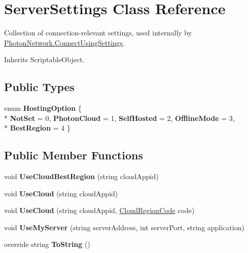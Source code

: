 \hypertarget{class_server_settings}{}\section{Server\+Settings Class Reference}
\label{class_server_settings}


Collection of connection-\/relevant settings, used internally by \hyperlink{class_photon_network_a0fdb79bcce45801ec81fbe56ffb939ec}{Photon\+Network.\+Connect\+Using\+Settings}.  




Inherits Scriptable\+Object.

\subsection*{Public Types}
\begin{DoxyCompactItemize}
\item 
enum {\bfseries Hosting\+Option} \{ \\*
{\bfseries Not\+Set} = 0, 
{\bfseries Photon\+Cloud} = 1, 
{\bfseries Self\+Hosted} = 2, 
{\bfseries Offline\+Mode} = 3, 
\\*
{\bfseries Best\+Region} = 4
 \}\hypertarget{class_server_settings_ac70398ae8a3414ab1429069965cfcd32}{}\label{class_server_settings_ac70398ae8a3414ab1429069965cfcd32}

\end{DoxyCompactItemize}
\subsection*{Public Member Functions}
\begin{DoxyCompactItemize}
\item 
void {\bfseries Use\+Cloud\+Best\+Region} (string cloud\+Appid)\hypertarget{class_server_settings_aeb0c2bda5dd14905c6d82c5166971117}{}\label{class_server_settings_aeb0c2bda5dd14905c6d82c5166971117}

\item 
void {\bfseries Use\+Cloud} (string cloud\+Appid)\hypertarget{class_server_settings_a3fd2ceafc9192779c59a646884ba9810}{}\label{class_server_settings_a3fd2ceafc9192779c59a646884ba9810}

\item 
void {\bfseries Use\+Cloud} (string cloud\+Appid, \hyperlink{_enums_8cs_af823e3be9567fa753720895120c9819b}{Cloud\+Region\+Code} code)\hypertarget{class_server_settings_ae9dc8779d32a07848cb6e9063ae215d6}{}\label{class_server_settings_ae9dc8779d32a07848cb6e9063ae215d6}

\item 
void {\bfseries Use\+My\+Server} (string server\+Address, int server\+Port, string application)\hypertarget{class_server_settings_ae0eef79dfdcf1d7d7577094dadc4ca4b}{}\label{class_server_settings_ae0eef79dfdcf1d7d7577094dadc4ca4b}

\item 
override string {\bfseries To\+String} ()\hypertarget{class_server_settings_a8a1c45242135b589ecc819e132c59655}{}\label{class_server_settings_a8a1c45242135b589ecc819e132c59655}

\end{DoxyCompactItemize}
